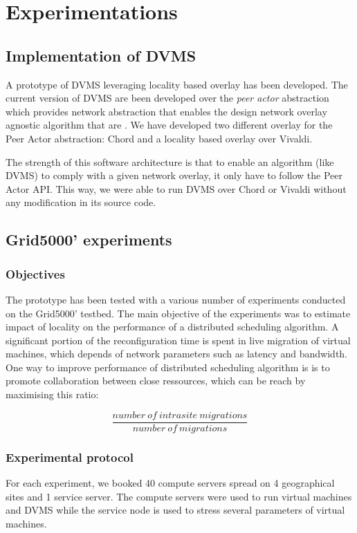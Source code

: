 \section{Experimentations}

\subsection{Implementation of DVMS}

A prototype of DVMS leveraging locality based overlay has been developed. The 
current version of DVMS are been developed over the \emph{peer actor} 
abstraction which provides network abstraction that enables the design network 
overlay agnostic algorithm that are . We have developed two different
overlay for the Peer Actor abstraction: Chord and a locality based overlay over
Vivaldi.

The strength of this software architecture is that to enable an algorithm (like
DVMS) to comply with a given network overlay, it only have to follow the Peer 
Actor API. This way, we were able to run DVMS over Chord or Vivaldi without any
modification in its source code.

\subsection{Grid5000' experiments}

\subsubsection{Objectives}
The prototype has been tested with a various number of experiments conducted on
the Grid5000' testbed. The main objective of the experiments was to estimate
impact of locality on the performance of a distributed scheduling algorithm. 
A significant portion of the reconfiguration time is spent in live migration of
virtual machines, which depends of network parameters such as latency and
bandwidth. One way to improve performance of distributed scheduling algorithm is
is to promote collaboration between close ressources, which can be reach by 
maximising this ratio:

\[
	\frac{number\ of\ intrasite\ migrations}{number\ of\ migrations}
\]

\subsubsection{Experimental protocol}
For each experiment, we booked 40 compute servers spread on 4 geographical sites
and 1 service server. The compute servers were used to run virtual machines and
DVMS while the service node is used to stress several parameters of 
virtual machines.

